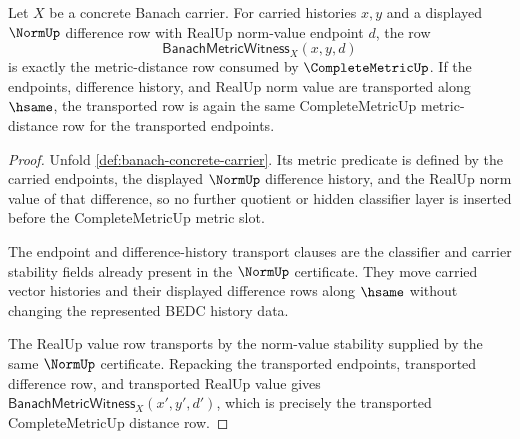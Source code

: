 \begin{theorem}
\label{thm:banach-norm-induced-metric-row}
Let $X$ be a concrete Banach carrier. For carried histories $x,y$ and a
displayed $\NormUp$ difference row with RealUp norm-value endpoint $d$, the row
$$
\mathsf{BanachMetricWitness}_X(x,y,d)
$$
is exactly the metric-distance row consumed by $\CompleteMetricUp$. If the
endpoints, difference history, and RealUp norm value are transported along
$\hsame$, the transported row is again the same CompleteMetricUp
metric-distance row for the transported endpoints.
\end{theorem}
\begin{proof}
Unfold \autoref{def:banach-concrete-carrier}. Its metric predicate is defined
by the carried endpoints, the displayed $\NormUp$ difference history, and the
RealUp norm value of that difference, so no further quotient or hidden
classifier layer is inserted before the CompleteMetricUp metric slot.

The endpoint and difference-history transport clauses are the classifier and
carrier stability fields already present in the $\NormUp$ certificate. They
move carried vector histories and their displayed difference rows along
$\hsame$ without changing the represented BEDC history data.

The RealUp value row transports by the norm-value stability supplied by the
same $\NormUp$ certificate. Repacking the transported endpoints, transported
difference row, and transported RealUp value gives
$\mathsf{BanachMetricWitness}_X(x',y',d')$, which is precisely the transported
CompleteMetricUp distance row.
\end{proof}

